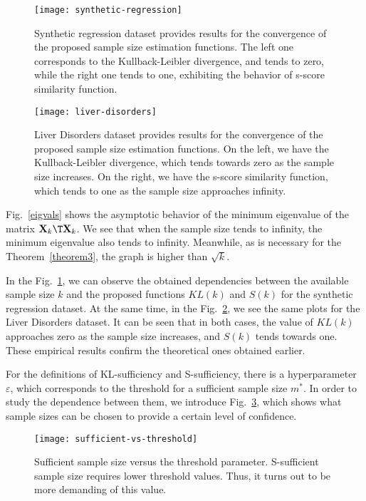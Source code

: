 \documentclass[sn-mathphys-num]{sn-jnl}%
\begin{document}
\begin{figure}[ht]
    \centering
    \texttt{[image: synthetic-regression]}
    \caption{Synthetic regression dataset provides results for the convergence of the proposed sample size estimation functions. The left one corresponds to the Kullback-Leibler divergence, and tends to zero, while the right one tends to one, exhibiting the behavior of s-score similarity function.}
    \label{synthetic-regression}
\end{figure}

\begin{figure}[ht]
    \centering
    \texttt{[image: liver-disorders]}
    \caption{Liver Disorders dataset provides results for the convergence of the proposed sample size estimation functions. On the left, we have the Kullback-Leibler divergence, which tends towards zero as the sample size increases. On the right, we have the s-score similarity function, which tends to one as the sample size approaches infinity.}
    \label{liver-disorders}
\end{figure}

Fig.~\ref{eigvals} shows the asymptotic behavior of the minimum eigenvalue of the matrix $\mathbf{X}_k\T \mathbf{X}_k$. We see that when the sample size tends to infinity, the minimum eigenvalue also tends to infinity. Meanwhile, as is necessary for the Theorem~\ref{theorem3}, the graph is higher than $\sqrt{k}$.

In the Fig.~\ref{synthetic-regression}, we can observe the obtained dependencies between the available sample size $k$ and the proposed functions $KL(k)$ and $S(k)$ for the synthetic regression dataset. At the same time, in the Fig.~\ref{liver-disorders}, we see the same plots for the Liver Disorders dataset. It can be seen that in both cases, the value of $KL(k)$ approaches zero as the sample size increases, and $S(k)$ tends towards one. These empirical results confirm the theoretical ones obtained earlier.

For the definitions of KL-sufficiency and S-sufficiency, there is a hyperparameter $\varepsilon$, which corresponds to the threshold for a sufficient sample size $m^*$. In order to study the dependence between them, we introduce Fig.~\ref{sufficient-vs-threshold}, which shows what sample sizes can be chosen to provide a certain level of confidence.

\begin{figure}[ht]
    \centering
    \texttt{[image: sufficient-vs-threshold]}
    \caption{Sufficient sample size versus the threshold parameter. S-sufficient sample size requires lower threshold values. Thus, it turns out to be more demanding of this value.}
    \label{sufficient-vs-threshold}
\end{figure}
\end{document}

